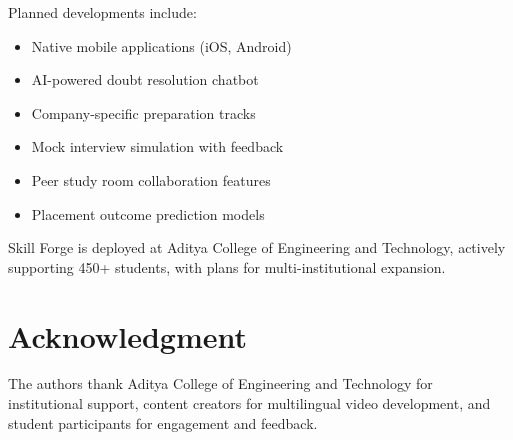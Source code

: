 \documentclass[journal]{IEEEtran}
\begin{document}
Planned developments include:
\begin{itemize}
    \item Native mobile applications (iOS, Android)
    \item AI-powered doubt resolution chatbot
    \item Company-specific preparation tracks
    \item Mock interview simulation with feedback
    \item Peer study room collaboration features
    \item Placement outcome prediction models
\end{itemize}

Skill Forge is deployed at Aditya College of Engineering and Technology, actively supporting 450+ students, with plans for multi-institutional expansion.

\section*{Acknowledgment}

The authors thank Aditya College of Engineering and Technology for institutional support, content creators for multilingual video development, and student participants for engagement and feedback.
\end{document}
